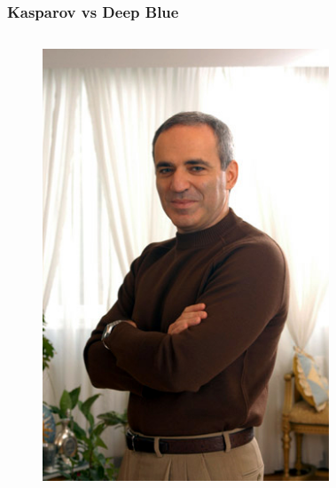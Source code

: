 \documentclass[12pt, aspectratio=169]{beamer}
\begin{document}
\begin{frame}
\frametitle{Kasparov vs Deep Blue}
\begin{columns}[c]
\begin{figure}
  \includegraphics[width=0.9\linewidth]{Kasparov-34.jpg}
\end{figure}
\begin{figure}

\end{figure}
\end{columns}
\end{frame}
\end{document}
